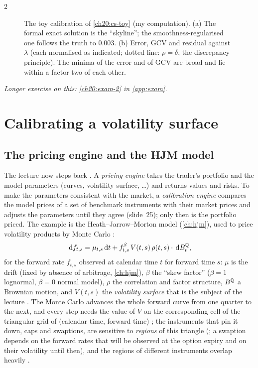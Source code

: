 \begin{paracol}{2}
\begin{figure}[ht]
\caption{The toy calibration of \cref{ch20:cs-toy} (my computation). (a) The formal exact solution is the ``skyline''; the smoothness-regularised one follows the truth to $0.003$. (b) Error, GCV and residual against $\lambda$ (each normalised as indicated; dotted line: $\rho=\delta$, the discrepancy principle). The minima of the error and of GCV are broad and lie within a factor two of each other.}\label{ch20:fig-toy}
\end{figure}

\noindent\emph{Longer exercise on this: \cref{ch20:exam-2} in \cref{app:exam}.}

\section{Calibrating a volatility surface}\label{ch20:sec-vol}

\subsection{The pricing engine and the HJM model}\label{ch20:sec-hjmvol}
The lecture now steps back . A \emph{pricing engine} takes the trader's portfolio and the model parameters (curves, volatility surface, \dots) and returns values and risks. To make
the parameters consistent with the market, a \emph{calibration engine} compares the model prices of a set of benchmark instruments with their market prices and adjusts the parameters until they agree
(slide~25); only then is the portfolio priced. The example is the Heath--Jarrow--Morton model (\cref{ch:hjm}), used to price volatility products by Monte Carlo :
\begin{equation}\label{ch20:eq-hjm}
  \,\mathrm{d} f_{t,s}=\mu_{t,s}\,\mathrm{d} t+f_{t,s}^{\beta}\,V(t,s)\,\rho(t,s)\cdot\,\mathrm{d} B^{\mathbb{Q}}_t ,
\end{equation}
for the forward rate $f_{t,s}$ observed at calendar time $t$ for forward time $s$: $\mu$ is the drift (fixed by absence of arbitrage, \cref{ch:hjm}), $\beta$ the ``skew factor'' ($\beta=1$ lognormal, $\beta=0$ normal model), $\rho$ the correlation and factor structure, $B^{\mathbb{Q}}$ a
Brownian motion, and $V(t,s)$ the \emph{volatility surface} that is the subject of the lecture . The Monte Carlo advances the whole forward curve from one quarter to the next, and every step needs the value of $V$ on
the corresponding cell of the triangular grid of (calendar time, forward time) ; the instruments that pin it down, caps and swaptions, are sensitive to \emph{regions} of this triangle (; a swaption
depends on the forward rates that will be observed at the option expiry and on their volatility until then), and the regions of different instruments overlap heavily .


\end{paracol}
